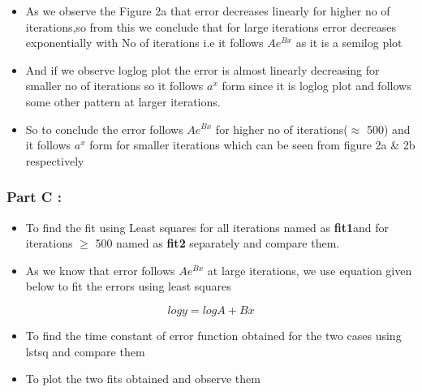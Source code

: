 \documentclass[11pt, a4paper, twoside]{article}
\begin{document}
 \begin{itemize}
 \item
   As we observe the Figure 2a that error decreases linearly for higher
   no of iterations,so from this we conclude that for large iterations
   error decreases exponentially with No of iterations i.e it follows
   \(Ae^{Bx}\) as it is a semilog plot
 \item
   And if we observe loglog plot the error is almost linearly decreasing
   for smaller no of iterations so it follows \(a^x\) form since it is
   loglog plot and follows some other pattern at larger iterations.
 \item
   So to conclude the error follows \(Ae^{Bx}\) for higher no of
   iterations(\(\approx\) 500) and it follows \(a^x\) form for smaller
   iterations which can be seen from figure 2a \& 2b respectively
 \end{itemize}
 

    \subsubsection{Part C :}\label{part-c}

\begin{itemize}
\item
  To find the fit using Least squares for all iterations named as
  \textbf{fit1}and for iterations \(\geq\) 500 named as \textbf{fit2}
  separately and compare them.
\item
  As we know that error follows \(Ae^{Bx}\) at large iterations, we use
  equation given below to fit the errors using least squares
\end{itemize}

\begin{equation}
    logy = logA + Bx
\end{equation}

\begin{itemize}
\item
  To find the time constant of error function obtained for the two cases
  using lstsq and compare them
\item
  To plot the two fits obtained and observe them
\end{itemize}
\end{document}
